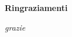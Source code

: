 \thispagestyle{empty}

\begin{center}
  {\bf \Huge Ringraziamenti}
\end{center}

\vspace{4cm}


\emph{
  grazie
}
